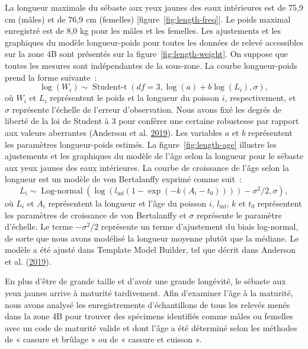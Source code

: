 \documentclass[french,11pt]{book}
\begin{document}
La longueur maximale du sébaste aux yeux jaunes des eaux intérieures est de 75,9 cm (mâles) et de 76,9 cm (femelles) {[}figure~\ref{fig:length-freq}{]}. Le poids maximal enregistré est de 8,0 kg pour les mâles et les femelles. Les ajustements et les graphiques du modèle longueur-poids pour toutes les données de relevé accessibles sur la zone 4B sont présentés sur la figure~\ref{fig:length-weight}. On suppose que toutes les mesures sont indépendantes de la sous-zone. La courbe longueur-poids prend la forme suivante~:
\begin{equation}
\log (W_i) \sim \operatorname{Student-t}(df = 3, \log(a) + b \log(L_i), \sigma),
\end{equation}
où \(W_i\) et \(L_i\) représentent le poids et la longueur du poisson \(i\), respectivement, et \(\sigma\) représente l'échelle de l'erreur d'observation. Nous avons fixé les degrés de liberté de la loi de Student à 3 pour conférer une certaine robustesse par rapport aux valeurs aberrantes (Anderson et al. \protect\hyperlink{ref-anderson2019synopsis}{2019}). Les variables \(a\) et \(b\) représentent les paramètres longueur-poids estimés. La figure~\ref{fig:length-age} illustre les ajustements et les graphiques du modèle de l'âge selon la longueur pour le sébaste aux yeux jaunes des eaux intérieures. La courbe de croissance de l'âge selon la longueur est un modèle de von Bertalanffy exprimé comme suit~:
\begin{equation}
L_i \sim \operatorname{Log-normal}
\left( \log(l_\mathrm{inf} (1 - \exp(-k (A_i - t_0)))) -
\sigma^2 / 2, \sigma \right),
\end{equation}
où \(L_i\) et \(A_i\) représentent la longueur et l'âge du poisson \(i\), \(l_\mathrm{inf}\), \(k\) et \(t_0\) représentent les paramètres de croissance de von Bertalanffy et \(\sigma\) représente le paramètre d'échelle. Le terme \(- \sigma^2 /2\) représente un terme d'ajustement du biais log-normal, de sorte que nous avons modélisé la longueur moyenne plutôt que la médiane. Le modèle a été ajusté dans Template Model Builder, tel que décrit dans Anderson et al. (\protect\hyperlink{ref-anderson2019synopsis}{2019}).

\hypertarget{sec:maturity}{%
\label{sec:maturity}}

En plus d'être de grande taille et d'avoir une grande longévité, le sébaste aux yeux jaunes arrive à maturité tardivement. Afin d'examiner l'âge à la maturité, nous avons analysé les enregistrements d'échantillons de tous les relevés menés dans la zone 4B pour trouver des spécimens identifiés comme mâles ou femelles avec un code de maturité valide et dont l'âge a été déterminé selon les méthodes de « cassure et brûlage » ou de « cassure et cuisson ».
\end{document}
